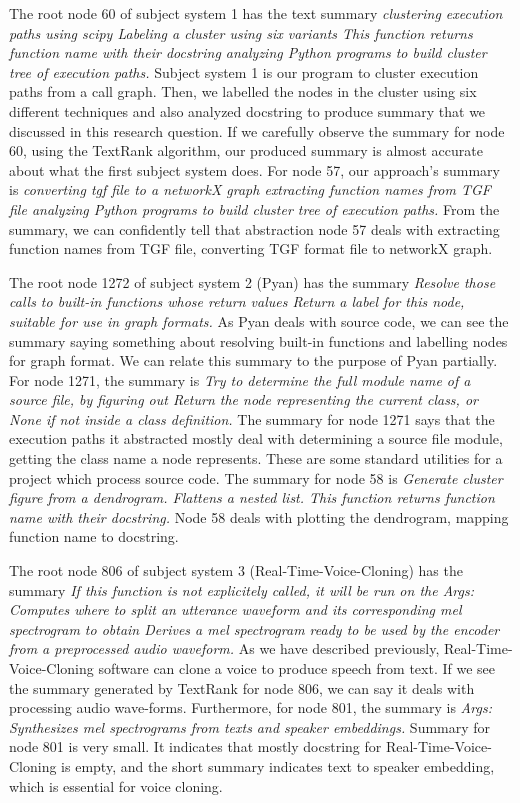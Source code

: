  The root node 60 of subject system 1 has the text summary \textit{clustering execution paths using scipy Labeling a cluster using six variants  This function returns function name with their docstring  analyzing Python programs to build cluster tree of execution paths.} Subject system 1 is our program to cluster execution paths from a call graph. Then, we labelled the nodes in the cluster using six different techniques and also analyzed docstring to produce summary that we discussed in this research question. If we carefully observe the summary for node 60, using the TextRank algorithm, our produced summary is almost accurate about what the first subject system does. For node 57, our approach's summary is \textit{converting tgf file to a networkX graph extracting function names from TGF file analyzing Python programs to build cluster tree of execution paths.} From the summary, we can confidently tell that abstraction node 57 deals with extracting function names from TGF file, converting TGF format file to networkX graph.
 
 
The root node 1272 of subject system 2 (Pyan) has the summary \textit{Resolve those calls to built-in functions whose return values Return a label for this node, suitable for use in graph formats.} As Pyan deals with source code, we can see the summary saying something about resolving built-in functions and labelling nodes for graph format. We can relate this summary to the purpose of Pyan partially. For node 1271, the summary is \textit{Try to determine the full module name of a source file, by figuring out       Return the node representing the current class, or None if not inside a class definition.}
The summary for node 1271 says that the execution paths it abstracted mostly deal with determining a source file module, getting the class name a node represents. These are some standard utilities for a project which process source code. The summary for node 58 is \textit{Generate cluster figure from a dendrogram. Flattens a nested list. This function returns function name with their docstring.} Node 58 deals with plotting the dendrogram, mapping function name to docstring.

The root node 806 of subject system 3 (Real-Time-Voice-Cloning) has the summary \textit{If this function is not explicitely called, it will be run on the Args:                  Computes where to split an utterance waveform and its corresponding mel spectrogram to obtain   Derives a mel spectrogram ready to be used by the encoder from a preprocessed audio waveform.} As we have described previously, Real-Time-Voice-Cloning software can clone a voice to produce speech from text. If we see the summary generated by TextRank for node 806, we can say it deals with processing audio wave-forms. Furthermore, for node 801, the summary is \textit{Args:   Synthesizes mel spectrograms from texts and speaker embeddings.} Summary for node 801 is very small. It indicates that mostly docstring for Real-Time-Voice-Cloning is empty, and the short summary indicates text to speaker embedding, which is essential for voice cloning.

